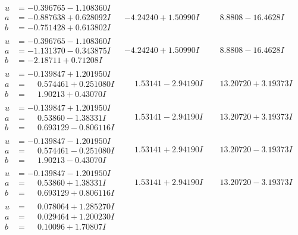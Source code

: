 \documentclass[1p]{elsarticle_modified}
\theoremstyle{definition}
\begin{document}
$$\begin{array}{c|c|c}
\begin{aligned}
u &= -0.396765 - 1.108360 I \\
a &= -0.887638 + 0.628092 I \\
b &= -0.751428 + 0.613802 I\end{aligned}
 & -4.24240 + 1.50990 I & \phantom{-}8.8808 - 16.4628 I \\ \hline\begin{aligned}
u &= -0.396765 - 1.108360 I \\
a &= -1.131370 - 0.343875 I \\
b &= -2.18711 + 0.71208 I\end{aligned}
 & -4.24240 + 1.50990 I & \phantom{-}8.8808 - 16.4628 I \\ \hline\begin{aligned}
u &= -0.139847 + 1.201950 I \\
a &= \phantom{-}0.574461 + 0.251080 I \\
b &= \phantom{-}1.90213 + 0.43070 I\end{aligned}
 & \phantom{-}1.53141 - 2.94190 I & \phantom{-}13.20720 + 3.19373 I \\ \hline\begin{aligned}
u &= -0.139847 + 1.201950 I \\
a &= \phantom{-}0.53860 - 1.38331 I \\
b &= \phantom{-}0.693129 - 0.806116 I\end{aligned}
 & \phantom{-}1.53141 - 2.94190 I & \phantom{-}13.20720 + 3.19373 I \\ \hline\begin{aligned}
u &= -0.139847 - 1.201950 I \\
a &= \phantom{-}0.574461 - 0.251080 I \\
b &= \phantom{-}1.90213 - 0.43070 I\end{aligned}
 & \phantom{-}1.53141 + 2.94190 I & \phantom{-}13.20720 - 3.19373 I \\ \hline\begin{aligned}
u &= -0.139847 - 1.201950 I \\
a &= \phantom{-}0.53860 + 1.38331 I \\
b &= \phantom{-}0.693129 + 0.806116 I\end{aligned}
 & \phantom{-}1.53141 + 2.94190 I & \phantom{-}13.20720 - 3.19373 I \\ \hline\begin{aligned}
u &= \phantom{-}0.078064 + 1.285270 I \\
a &= \phantom{-}0.029464 + 1.200230 I \\
b &= \phantom{-}0.10096 + 1.70807 I\end{aligned}

\end{array}$$
\end{document}
